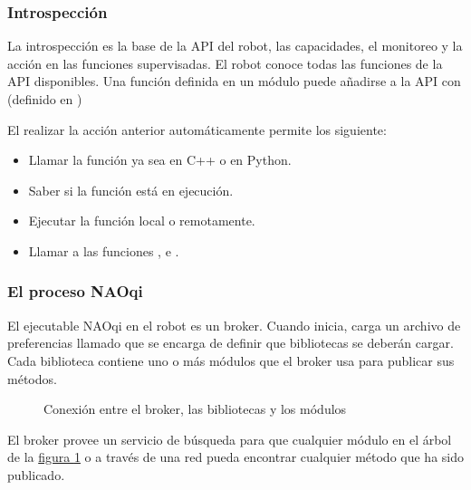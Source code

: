 \subsubsection{Introspección}
\label{\detokenize{chapter_one/naoqi:introspeccion}}
La introspección es la base de la API del robot, las capacidades, el monitoreo
y la acción en las funciones supervisadas. El robot conoce todas las funciones
de la API disponibles. Una función definida en un módulo puede añadirse a la
API con  (definido en )

El realizar la acción anterior automáticamente permite los siguiente:
\begin{itemize}
\item {} 
Llamar la función ya sea en C++ o en Python.

\item {} 
Saber si la función está en ejecución.

\item {} 
Ejecutar la función local o remotamente.

\item {} 
Llamar a las funciones ,  e .

\end{itemize}


\subsubsection{El proceso NAOqi}
\label{\detokenize{chapter_one/naoqi:el-proceso-naoqi}}
El ejecutable NAOqi en el robot es un broker.
Cuando inicia, carga un archivo de
preferencias llamado  que se encarga de definir que bibliotecas
se deberán cargar. Cada biblioteca contiene uno o más módulos que el broker usa
para publicar sus métodos.

\begin{figure}[htbp]
\centering
\capstart
\noindent{}
\caption{Conexión entre el broker, las bibliotecas y los módulos}\label{\detokenize{chapter_one/naoqi:broker-lib-mod}}\end{figure}

El broker provee un servicio de búsqueda para que cualquier módulo en el árbol
de la \hyperref[\detokenize{chapter_one/naoqi:broker-lib-mod}]{figura \ref{\detokenize{chapter_one/naoqi:broker-lib-mod}}} o a través de una red pueda encontrar cualquier
método que ha sido publicado.

